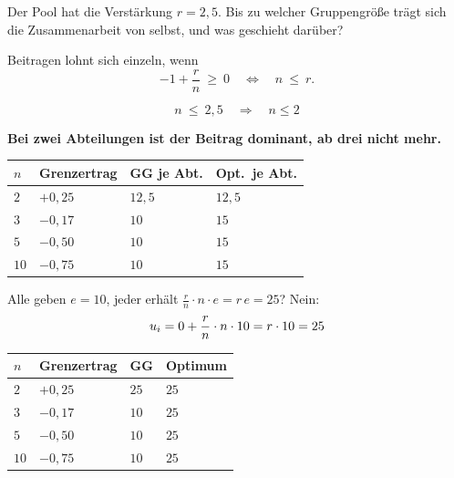 \begin{aufgabe}
Der Pool hat die Verstärkung $r = 2{,}5$. Bis zu welcher Gruppengröße trägt sich die Zusammenarbeit von selbst, und was geschieht darüber?

\loesung
{}
Beitragen lohnt sich einzeln, wenn
\[ -1 + \frac{r}{n} \ \ge\ 0 \quad\Longleftrightarrow\quad n \ \le\ r . \]

\[ n \ \le\ 2{,}5 \quad\Longrightarrow\quad n \le 2 \]

\begin{center}
\begin{minipage}{0.9\textwidth}
\textbf{Bei zwei Abteilungen ist der Beitrag dominant, ab drei nicht mehr.}
\end{minipage}
\end{center}

\begin{center}
{\small
\renewcommand{\arraystretch}{1.48}
\begin{tabular}{@{}P{1.4cm}P{2.2cm}P{2.2cm}P{2.2cm}@{}}
\toprule
$n$ & \textbf{Grenzertrag} & \textbf{GG je Abt.} & \textbf{Opt.\ je Abt.}\\
\midrule
$2$ & $+0{,}25$ & $12{,}5$ & $12{,}5$\\
$3$ & $-0{,}17$ & $10$ & $15$\\
$5$ & $-0{,}50$ & $10$ & $15$\\
$10$ & $-0{,}75$ & $10$ & $15$\\
\bottomrule
\end{tabular}}
\end{center}

 Alle geben $e=10$, jeder erhält $\frac{r}{n}\cdot n\cdot e = r\,e = 25$? Nein:
\[ u_i = 0 + \frac{r}{n}\cdot n\cdot 10 = r\cdot10 = 25 \]

\begin{center}
\begin{minipage}{0.86\textwidth}
\end{minipage}
\end{center}

\begin{center}
{\small
\renewcommand{\arraystretch}{1.48}
\begin{tabular}{@{}P{1.4cm}P{2.2cm}P{2.0cm}P{2.4cm}@{}}
\toprule
$n$ & \textbf{Grenzertrag} & \textbf{GG} & \textbf{Optimum}\\
\midrule
$2$ & $+0{,}25$ & $25$ & $25$\\
$3$ & $-0{,}17$ & $10$ & $25$\\
$5$ & $-0{,}50$ & $10$ & $25$\\
$10$ & $-0{,}75$ & $10$ & $25$\\
\bottomrule
\end{tabular}}
\end{center}


\end{aufgabe}
